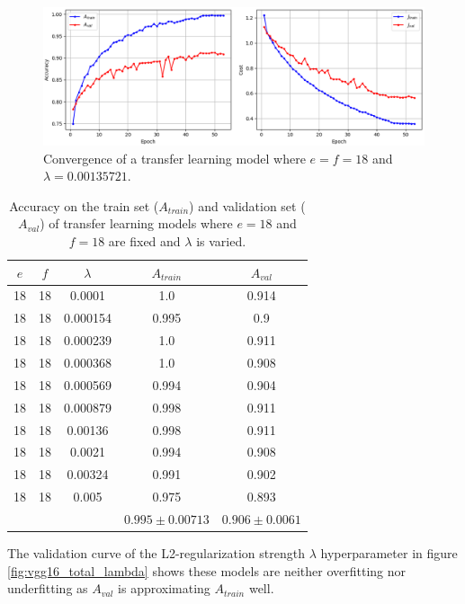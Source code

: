 \begin{figure}[ht]
    \centering
    \includegraphics[width=1.0\textwidth]{figs/vgg16_total_convergence.png}
    \caption{Convergence of a transfer learning model where $e = f = 18$ and $\lambda = 0.00135721$.}
    \label{fig:vgg16_total_convergence}
\end{figure}

\begin{table}[ht]
\centering
\begin{tabular}{ |c|c|c|c|c| }
\hline
$e$ & $f$ & $\lambda$ & $A_{train}$ & $A_{val}$ \\
\hline
18 & 18 & 0.0001 & 1.0 & 0.914 \\
18 & 18 & 0.000154 & 0.995 & 0.9 \\
18 & 18 & 0.000239 & 1.0 & 0.911 \\
18 & 18 & 0.000368 & 1.0 & 0.908 \\
18 & 18 & 0.000569 & 0.994 & 0.904 \\
18 & 18 & 0.000879 & 0.998 & 0.911 \\
18 & 18 & 0.00136 & 0.998 & 0.911 \\
18 & 18 & 0.0021 & 0.994 & 0.908 \\
18 & 18 & 0.00324 & 0.991 & 0.902 \\
18 & 18 & 0.005 & 0.975 & 0.893 \\
\hline
 & & & $0.995\pm0.00713$ & $0.906\pm0.0061$ \\
\hline
\end{tabular}
\caption{Accuracy on the train set ($A_{train}$) and validation set ($A_{val}$) of transfer learning models where $e = 18$ and $f = 18$ are fixed and $\lambda$ is varied.}
\label{table:vgg16_total}
\end{table}

The validation curve of the L2-regularization strength $\lambda$ hyperparameter in figure \ref{fig:vgg16_total_lambda} shows these models are neither overfitting nor underfitting as $A_{val}$ is approximating $A_{train}$ well.

